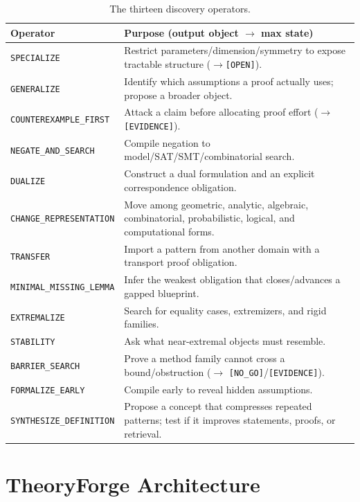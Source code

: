 \documentclass[11pt]{amsart}
\theoremstyle{definition}
\theoremstyle{remark}
\newcommand{\state}[1]{\texttt{[#1]}}
\newcommand{\op}[1]{\texttt{#1}}
\begin{document}
\begin{table}[t]\small
\caption{The thirteen discovery operators.}\label{tab:ops}
\begin{tabular}{@{}p{3.1cm}p{9.2cm}@{}}
\toprule
Operator & Purpose (output object $\to$ max state)\\
\midrule
\op{SPECIALIZE} & Restrict parameters/dimension/symmetry to expose tractable structure ($\to$\state{OPEN}).\\
\op{GENERALIZE} & Identify which assumptions a proof actually uses; propose a broader object.\\
\op{COUNTEREXAMPLE\_FIRST} & Attack a claim before allocating proof effort ($\to$\state{EVIDENCE}).\\
\op{NEGATE\_AND\_SEARCH} & Compile negation to model/SAT/SMT/combinatorial search.\\
\op{DUALIZE} & Construct a dual formulation and an explicit correspondence obligation.\\
\op{CHANGE\_REPRESENTATION} & Move among geometric, analytic, algebraic, combinatorial, probabilistic, logical, and computational forms.\\
\op{TRANSFER} & Import a pattern from another domain with a transport proof obligation.\\
\op{MINIMAL\_MISSING\_LEMMA} & Infer the weakest obligation that closes/advances a gapped blueprint.\\
\op{EXTREMALIZE} & Search for equality cases, extremizers, and rigid families.\\
\op{STABILITY} & Ask what near-extremal objects must resemble.\\
\op{BARRIER\_SEARCH} & Prove a method family cannot cross a bound/obstruction ($\to$ \state{NO\_GO}/\state{EVIDENCE}).\\
\op{FORMALIZE\_EARLY} & Compile early to reveal hidden assumptions.\\
\op{SYNTHESIZE\_DEFINITION} & Propose a concept that compresses repeated patterns; test if it improves statements, proofs, or retrieval.\\
\bottomrule
\end{tabular}
\end{table}

\section{TheoryForge Architecture}\label{sec:arch}
\end{document}
